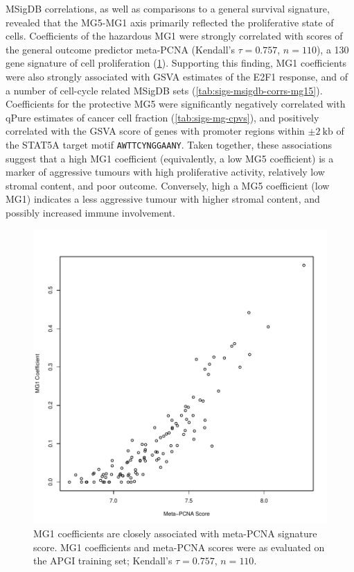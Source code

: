 \documentclass[dissertation.tex]{subfiles}
\begin{document}
\gls{MSigDB} correlations, as well as comparisons to a general survival signature, revealed that the MG5-MG1 axis primarily reflected the proliferative state of cells.  Coefficients of the hazardous MG1 were strongly correlated with scores of the general outcome predictor meta-PCNA (Kendall's $\tau = 0.757$, $n = 110$), a 130 gene signature of cell proliferation \cite{Venet2011} (\cref{fig:sigs-mg1-pcna}).  Supporting this finding, MG1 coefficients were also strongly associated with \gls{GSVA} estimates of the E2F1 response, and of a number of cell-cycle related \gls{MSigDB} sets (\cref{tab:sigs-msigdb-corrs-mg15}).  Coefficients for the protective MG5 were significantly negatively correlated with qPure estimates of cancer cell fraction \cite{Song2012} (\cref{tab:sigs-mg-cpvs}), and positively correlated with the \gls{GSVA} score of genes with promoter regions within $\pm 2\ \text{kb}$ of the STAT5A target motif \texttt{AWTTCYNGGAANY}.  Taken together, these associations suggest that a high MG1 coefficient (equivalently, a low MG5 coefficient) is a marker of aggressive tumours with high proliferative activity, relatively low stromal content, and poor outcome.  Conversely, high a MG5 coefficient (low MG1) indicates a less aggressive tumour with higher stromal content, and possibly increased immune involvement.

\begin{figure}
\centering
\includegraphics[width=.7\linewidth]{analysis/biosurv/reports/18_SIS_diag_dsd_final/figure/metagene-pairs-7}
\caption{MG1 coefficients are closely associated with meta-PCNA signature score.  MG1 coefficients and meta-PCNA \cite{Venet2011} scores were as evaluated on the \gls{APGI} training set; Kendall's $\tau = 0.757$, $n = 110$.\label{fig:sigs-mg1-pcna}}
\end{figure}
\end{document}
